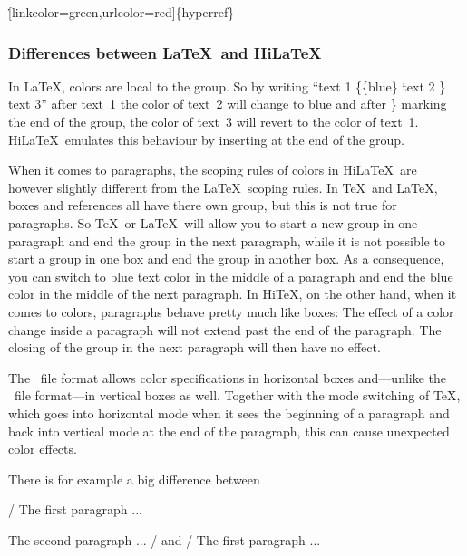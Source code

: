 \.{[linkcolor=green,urlcolor=red]\{hyperref\}}

\subsubsection{Differences between \LaTeX\ and Hi\LaTeX}

\par\smallskip\noindent
In \LaTeX, colors are local to the group. So by writing
``\.{text 1} \.{\{}\.{\{blue\}} \.{text 2} \.{\}} \.{text 3}''
after \.{text~1} the color of \.{text~2} will change to  blue and after \.{\}}
marking the end of the group, the color of \.{text~3} will revert to the
color of \.{text~1}. Hi\LaTeX\ emulates this behaviour by inserting
 at the end of the group.

When it comes to paragraphs,
the scoping rules of colors in Hi\LaTeX\ are however slightly
different from the \LaTeX\ scoping rules.
In \TeX\ and \LaTeX, boxes and references all have there own group,
but this is not true for paragraphs.
So \TeX\ or \LaTeX\ will allow you to start a new group in one paragraph and
end the group in the next paragraph, while it is not possible to start a
group in one box and end the group in another box. As a consequence,
you can switch to blue text color in the middle of a paragraph and end the blue
color in the middle of the next paragraph.
In Hi\TeX, on the other hand, when it comes to colors,
paragraphs behave pretty much like boxes: The effect of a color change inside
a paragraph will not extend past the end of the paragraph. The closing of the
group in the next paragraph will then have no effect.

\bigskip{}\par\smallskip\noindent
The \HINT\ file format allows color specifications in horizontal boxes
and---unlike the \PDF\ file format---in vertical boxes as well.
Together with the mode switching of \TeX, which goes into horizontal mode
when it sees the beginning of a paragraph and back into vertical mode at
the end of the paragraph, this can cause unexpected color effects.

There is for example a big difference between

\medskip
\verbatim/\color{blue}
The first paragraph ...

The second paragraph ...
/
\medskip
and
\medskip
\verbatim/\indent
\color{blue}
The first paragraph ...

